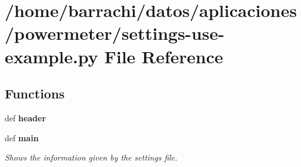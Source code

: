 \hypertarget{settings-use-example_8py}{\section{/home/barrachi/datos/aplicaciones/powermeter/settings-\/use-\/example.py \-File \-Reference}
\label{settings-use-example_8py}
}
\subsection*{\-Functions}
\begin{DoxyCompactItemize}
\item 
def {\bfseries header}
\item 
def {\bfseries main}
\begin{DoxyCompactList}\small\item\em \-Shows the information given by the settings file. \end{DoxyCompactList}\end{DoxyCompactItemize}
